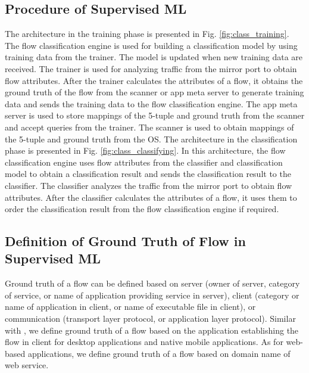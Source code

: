 \documentclass[journal]{IEEEtran}
\begin{document}
\subsection{Procedure of Supervised ML}
The architecture in the training phase is presented in Fig. \ref{fig:class_training}. The flow classification engine is used for building a classification model by using training data from the trainer. The model is updated when new training data are received. The trainer is used for analyzing traffic from the mirror port to obtain flow attributes. After the trainer calculates the attributes of a flow, it obtains the ground truth of the flow from the scanner or app meta server to generate training data and sends the training data to the flow classification engine. The app meta server is used to store mappings of the 5-tuple and ground truth from the scanner and accept queries from the trainer. The scanner is used to obtain mappings of the 5-tuple and ground truth from the OS. The architecture in the classification phase is presented in Fig. \ref{fig:class_classifying}. In this architecture, the flow classification engine uses flow attributes from the classifier and classification model to obtain a classification result and sends the classification result to the classifier. The classifier analyzes the traffic from the mirror port to obtain flow attributes. After the classifier calculates the attributes of a flow, it uses them to order the classification result from the flow classification engine if required.



\subsection{Definition of Ground Truth of Flow in Supervised ML}
Ground truth of a flow can be defined based on server (owner of server, category of service, or name of application providing service in server), client (category or name of application in client, or name of executable file in client), or communication (transport layer protocol, or application layer protocol). Similar with\cite{Qazi2013} \cite{Iwai2016}, we define ground truth of a flow based on the application establishing the flow in client for desktop applications and native mobile applications. As for web-based applications, we define ground truth of a flow based on domain name of web service.
\end{document}
